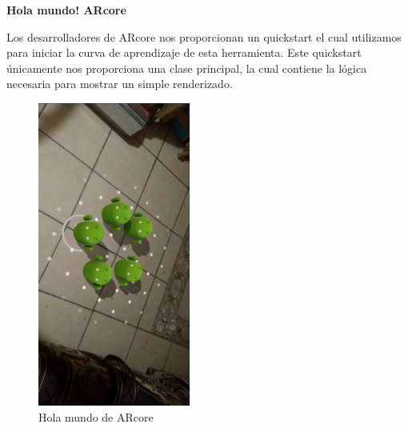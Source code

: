\textbf{Hola mundo! ARcore}

Los desarrolladores de ARcore nos proporcionan un quickstart el cual utilizamos para iniciar la curva de aprendizaje de esta herramienta. Este quickstart únicamente nos proporciona una clase principal, la cual contiene la lógica necesaria para mostrar un simple renderizado. 


\begin{figure}[H]
	\centering
	\includegraphics[width=5cm]{imagenes/iteraciones/AR1.png}
	\caption{Hola mundo de ARcore}
	\label{fig:HMARcore}
\end{figure}